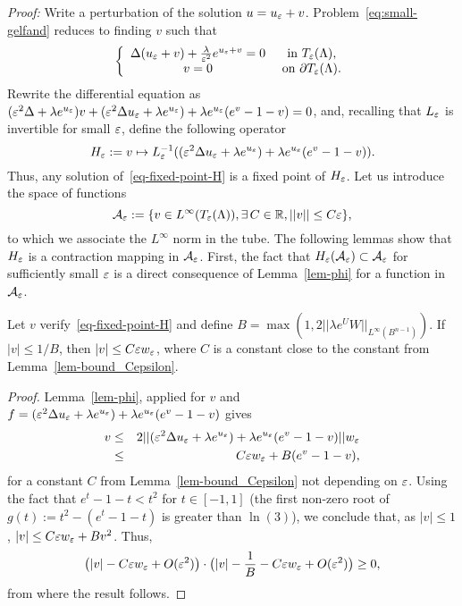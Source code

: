 \textit{Proof:} Write a perturbation of the solution $u=u_\varepsilon+v$.
Problem~\ref{eq:small-gelfand} reduces to finding $v$ such that
\begin{equation}
    \label{eq-fixed-point-H}
    \left\{
        \begin{array}{cc}
            \Delta (u_\varepsilon+v)+\frac{\lambda}{\varepsilon^2}e^{u_\varepsilon+v}=0& \mbox{ in }T_\varepsilon(\Lambda),\\
            v=0 & \mbox{ on }\partial T_\varepsilon(\Lambda).
        \end{array}
    \right.
\end{equation}
Rewrite the differential equation as $(\varepsilon^2\Delta + \lambda
e^{u_\varepsilon})v+(\varepsilon^2\Delta u_\varepsilon + \lambda e^{u_\varepsilon})+\lambda
e^{u_\varepsilon}(e^v-1-v)=0$, and, recalling that $L_\varepsilon$ is invertible for
small $\varepsilon$, define the following operator
\begin{equation}
    H_\varepsilon:= v\mapsto L_\varepsilon^{-1}((\varepsilon^2\Delta u_\varepsilon + \lambda
    e^{u_\varepsilon})+\lambda e^{u_\varepsilon}(e^v-1-v)).
\end{equation}
Thus, any solution of~\ref{eq-fixed-point-H}  is a fixed point of $H_\varepsilon$. Let us introduce the space of functions
\[
\mathcal{A}_\varepsilon :=\{v\in L^\infty(T_\varepsilon(\Lambda)),\exists\, C \in \mathbb{R}, ||v||\leq
C\varepsilon\},
\]
to which we associate the $L^\infty$ norm in the tube.
The following lemmas show that $H_\varepsilon$ is a contraction mapping in
$\mathcal{A}_\varepsilon$. First, the fact that $H_\varepsilon(\mathcal{A}_\varepsilon)\subset \mathcal{A}_\varepsilon$ for
sufficiently small $\varepsilon$ is a direct consequence of Lemma~\ref{lem-phi} for
a function in $\mathcal{A}_\varepsilon$. 
\begin{lemma}
    Let $v$ verify~\ref{eq-fixed-point-H} and define $B=\max(1,2||\lambda
    e^U W||_{L^\infty(B^{n-1})})$. If $|v|\leq 1/B$, then $|v|\leq C\varepsilon
    w_\varepsilon$, where $C$ is a constant close to the constant from
    Lemma~\ref{lem-bound_Cepsilon}.
\end{lemma}
\begin{proof} Lemma~\ref{lem-phi}, applied for $v$ and $f=(\varepsilon^2\Delta
    u_\varepsilon+\lambda e^{u_\varepsilon})+ \lambda e^{u_\varepsilon}(e^v-1-v)$ gives
    \begin{eqnarray}
        v &\leq & 2 ||(\varepsilon^2\Delta u_\varepsilon + \lambda e^{u_\varepsilon})+\lambda
        e^{u_\varepsilon}(e^v-1-v)||w_\varepsilon\\
          &\leq & C\varepsilon w_\varepsilon + B(e^v-1-v),
    \end{eqnarray}
    for a constant $C$ from Lemma~\ref{lem-bound_Cepsilon} not depending on
    $\varepsilon$. Using the fact that $e^t-1-t<t^2$ for $t\in[-1,1]$ (the first
    non-zero root of $g(t):=t^2-(e^t-1-t)$ is greater than $\ln(3)$), we
    conclude that, as $|v|\leq 1$, $|v|\leq C\varepsilon w_\varepsilon+Bv^2$. Thus,
    \begin{equation}
        \big(|v|-C\varepsilon w_\varepsilon+O(\varepsilon^2)\big)\cdot\big( |v| -\frac{1}{B}-C\varepsilon
        w_\varepsilon+O(\varepsilon^2)\big)\geq 0,
    \end{equation}
    from where the result follows. 
\end{proof}

